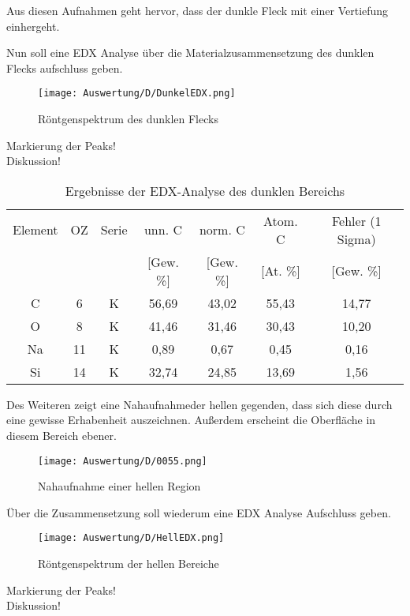Aus diesen Aufnahmen geht hervor, dass der dunkle Fleck mit einer Vertiefung einhergeht.

\newpage
Nun soll eine EDX Analyse über die Materialzusammensetzung des dunklen Flecks aufschluss geben.
\begin{figure}[h]
    \centering
    \texttt{[image: Auswertung/D/DunkelEDX.png]}
    \caption{Röntgenspektrum des dunklen Flecks}
\end{figure}

Markierung der Peaks!\\
Diskussion!\\

\begin{table}[h]
    \centering
    \begin{tabular}{c|c|c|c|c|c|c}
        Element & OZ &Serie& unn. C & norm. C &  Atom. C  & Fehler (1 Sigma) \\
         & & & [Gew. \%] & [Gew. \%] & [At. \%] & [Gew. \%] \\
        \hline\hline
        C & 6 & K & 56,69 & 43,02 & 55,43 & 14,77\\
        O & 8 & K & 41,46 & 31,46 & 30,43 & 10,20\\
        Na & 11 & K & 0,89 & 0,67 & 0,45 & 0,16\\
        Si & 14 & K & 32,74 & 24,85 & 13,69 & 1,56
    \end{tabular}
    \caption{Ergebnisse der EDX-Analyse des dunklen Bereichs}
\end{table}

\newpage
Des Weiteren zeigt eine Nahaufnahmeder hellen gegenden, dass sich diese durch eine gewisse Erhabenheit auszeichnen. Außerdem erscheint die Oberfläche in diesem Bereich ebener.
\begin{figure}[h]
    \centering
    \texttt{[image: Auswertung/D/0055.png]}
    \caption{Nahaufnahme einer hellen Region}
\end{figure}

\newpage
Über die Zusammensetzung soll wiederum eine EDX Analyse Aufschluss geben.
\begin{figure}[h]
    \centering
    \texttt{[image: Auswertung/D/HellEDX.png]}
    \caption{Röntgenspektrum der hellen Bereiche}
\end{figure}

Markierung der Peaks!\\
Diskussion!\\

